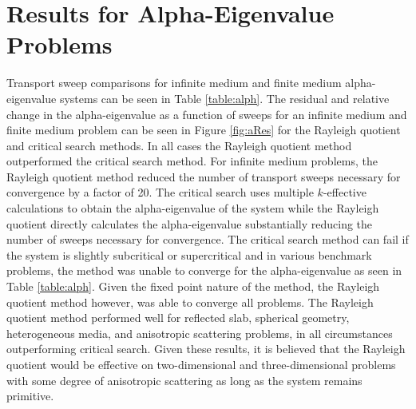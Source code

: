 \section{Results for Alpha-Eigenvalue Problems}
Transport sweep comparisons for infinite medium and finite medium alpha-eigenvalue systems can be seen in Table \ref{table:alph}. The residual and relative change in the alpha-eigenvalue as a function of sweeps for an infinite medium and finite medium problem can be seen in Figure \ref{fig:aRes} for the Rayleigh quotient and critical search methods. In all cases the Rayleigh quotient method outperformed the critical search method. For infinite medium problems, the Rayleigh quotient method reduced the number of transport sweeps necessary for convergence by a factor of 20. The critical search uses multiple $k$-effective calculations to obtain the alpha-eigenvalue of the system while the Rayleigh quotient directly calculates the alpha-eigenvalue substantially reducing the number of sweeps necessary for convergence. The critical search method can fail if the system is slightly subcritical or supercritical and in various benchmark problems, the method was unable to converge for the alpha-eigenvalue as seen in Table \ref{table:alph}. Given the fixed point nature of the method, the Rayleigh quotient method however, was able to converge all problems. The Rayleigh quotient method performed well for reflected slab, spherical geometry, heterogeneous media, and anisotropic scattering problems, in all circumstances outperforming critical search. Given these results, it is believed that the Rayleigh quotient would be effective on two-dimensional and three-dimensional problems with some degree of anisotropic scattering as long as the system remains primitive.


